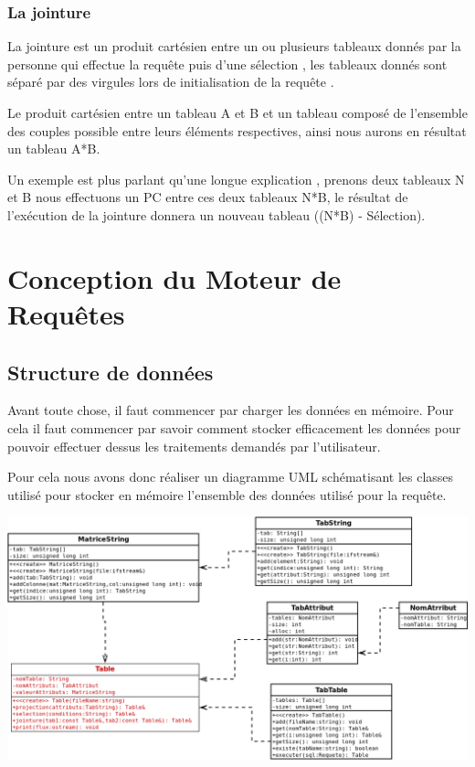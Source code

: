 \documentclass[oneside,13pt,a4paper]{report}
\begin{document}
        \subsection{La jointure}

            La jointure est un produit cartésien entre un ou plusieurs tableaux donnés par la personne qui effectue la requête puis d'une sélection , les tableaux donnés sont séparé par des virgules lors de initialisation de la requête .

            Le produit cartésien entre un tableau A et B et un tableau composé de l'ensemble des couples possible entre leurs éléments respectives, ainsi nous aurons en résultat un tableau A*B.

	          Un exemple est plus parlant qu'une longue explication , prenons deux tableaux N et B nous effectuons un PC entre ces deux tableaux N*B, le résultat de l’exécution de la jointure donnera un nouveau tableau ((N*B) - Sélection).


    \chapter{Conception du Moteur de Requêtes}

        \section{Structure de données}
            Avant toute chose, il faut commencer par charger les données en mémoire. Pour cela il faut commencer par savoir comment stocker efficacement les données pour pouvoir effectuer dessus les traitements demandés par l’utilisateur.

            Pour cela nous avons donc réaliser un diagramme UML schématisant les classes utilisé pour stocker en mémoire l’ensemble des données utilisé pour la requête.

            \includegraphics[width=1\textwidth]{img/sql.png}\par
\end{document}
